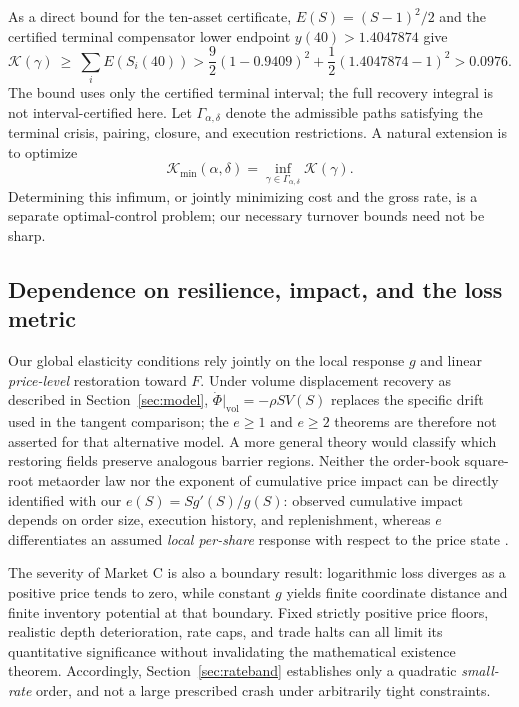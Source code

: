 \documentclass[review,hidelinks,onefignum,onetabnum]{siamonline250211}
\begin{document}
As a direct bound for the ten-asset certificate, $E(S)=(S-1)^2/2$ and the certified terminal compensator lower endpoint $y(40)>1.4047874$ give
\[
\mathcal K(\gamma)\ \ge\ \sum_i E(S_i(40))
>\frac92(1-0.9409)^2+\frac12(1.4047874-1)^2>0.0976.
\]
The bound uses only the certified terminal interval; the full recovery integral is not interval-certified here. Let $\Gamma_{\alpha,\delta}$ denote the admissible paths satisfying the terminal crisis, pairing, closure, and execution restrictions. A natural extension is to optimize
\[
\mathcal K_{\min}(\alpha,\delta)
=\inf_{\gamma\in\Gamma_{\alpha,\delta}}\mathcal K(\gamma).
\]
Determining this infimum, or jointly minimizing cost and the gross rate, is a separate optimal-control problem; our necessary turnover bounds need not be sharp.

\subsection{Dependence on resilience, impact, and the loss metric}
Our global elasticity conditions rely jointly on the local response $g$ and linear \emph{price-level} restoration toward $F$. Under volume displacement recovery as described in Section~\ref{sec:model}, $\dot\Phi|_{\mathrm{vol}}=-\rho S V(S)$ replaces the specific drift used in the tangent comparison; the $e\ge1$ and $e\ge2$ theorems are therefore not asserted for that alternative model. A more general theory would classify which restoring fields preserve analogous barrier regions. Neither the order-book square-root metaorder law nor the exponent of cumulative price impact can be directly identified with our $e(S)=Sg'(S)/g(S)$: observed cumulative impact depends on order size, execution history, and replenishment, whereas $e$ differentiates an assumed \emph{local per-share} response with respect to the price state \citep{AlfonsiFruthSchied2010,BucciEtAl2019,CuratoGatheralLillo2017}.

The severity of Market C is also a boundary result: logarithmic loss diverges as a positive price tends to zero, while constant $g$ yields finite coordinate distance and finite inventory potential at that boundary. Fixed strictly positive price floors, realistic depth deterioration, rate caps, and trade halts can all limit its quantitative significance without invalidating the mathematical existence theorem. Accordingly, Section~\ref{sec:rateband} establishes only a quadratic \emph{small-rate} order, and not a large prescribed crash under arbitrarily tight constraints.
\end{document}
